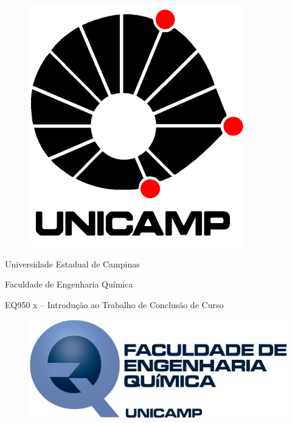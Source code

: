 
\begin{titlepage}
\begin{center}

\begin{minipage}{0.15\linewidth}
    \begin{flushleft}
        \begin{figure}[H]
    		\includegraphics[scale=0.2]{Imagens/LOGO-UNICAMP.png}
    	\end{figure}
    \end{flushleft}
\end{minipage}
\begin{minipage}{0.6\linewidth}
	\begin{center}
		
		Universidade Estadual de Campinas
		
		Faculdade de Engenharia Química
		
		EQ950 x – Introdução ao Trabalho de Conclusão de Curso
		
	\end{center}
\end{minipage}
\begin{minipage}{0.22\linewidth}
    \begin{flushleft}
        \begin{figure}[H]
    		\includegraphics[scale=0.3]{Imagens/LOGO-EQ.jpg}
    	\end{figure}
    \end{flushleft}
\end{minipage}


\end{center}
\end{titlepage}
